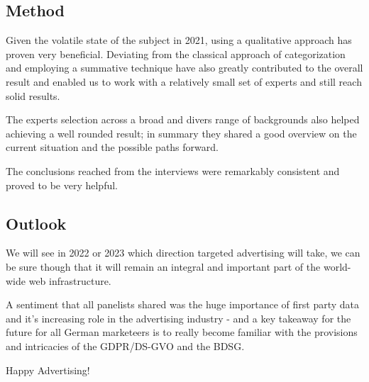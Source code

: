 \subsection{Method}

Given the volatile state of the subject in 2021, using a qualitative approach has proven very beneficial. Deviating from the classical approach of categorization and employing a summative technique have also greatly contributed to the overall result and enabled us to work with a relatively small set of experts and still reach solid results.

The experts selection across a broad and divers range of backgrounds also helped achieving a well rounded result; in summary they shared a good overview on the current situation and the possible paths forward.

The conclusions reached from the interviews were remarkably consistent and proved to be very helpful.

\subsection{Outlook}

We will see in 2022 or 2023 which direction targeted advertising will take, we can be sure though that it will remain an integral and important part of the world-wide web infrastructure.

A sentiment that all panelists shared was the huge importance of first party data and it's increasing role in the advertising industry - and a key takeaway for the future for all German marketeers is to really become familiar with the provisions and intricacies of the GDPR/DS-GVO and the BDSG.

\par\medskip

Happy Advertising!
